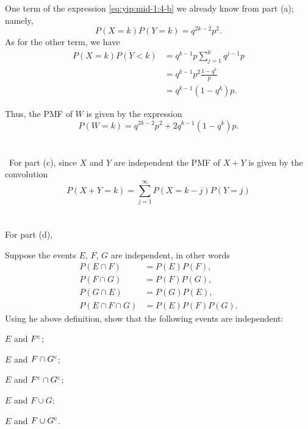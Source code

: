 \begin{solution*}
  One term of the expression \eqref{eq:yip:mid-1:4-b} we already know from
  part (a); namely,
  \[
    P(X=k)P(Y=k)=q^{2k-2}p^2.
  \]
  As for the other term, we have
  \begin{align*}
    P(X=k)P(Y<k)
    &=q^{k-1}p\sum_{j=1}^k q^{j-1}p\\
    &=q^{k-1}p^2\frac{1-q^k}{p}\\
    &=q^{k-1}(1-q^k)p.
  \end{align*}

  Thus, the PMF of \(W\) is given by the expression
  \[
    P(W=k)=q^{2k-2}p^2+2q^{k-1}(1-q^k)p.
  \]
  \\\\\
  For part (c), since \(X\) and \(Y\) are independent the PMF of \(X+Y\) is
  given by the convolution
  \[
    P(X+Y=k)=\sum_{j=1}^\infty P(X=k-j)P(Y=j)
  \]
  \\\\
  For part (d),
\end{solution*}

\begin{problem}
  Suppose the events \(E\), \(F\), \(G\) are independent, in other words
  \begin{align*}
    P(E\cap F)&=P(E)P(F),\\
    P(F\cap G)&=P(F)P(G),\\
    P(G\cap E)&=P(G)P(E),\\
    P(E\cap F\cap G)&=P(E)P(F)P(G).
  \end{align*}
  Using he above definition, show that the following events are
  independent:
  \begin{alphlist}
  \item \(E\) and \(F^{\mathrm{c}}\);
  \item \(E\) and \(F\cap G^{\mathrm{c}}\);
  \item \(E\) and \(F^{\mathrm{c}}\cap G^{\mathrm{c}}\);
  \item \(E\) and \(F\cup G\);
  \item \(E\) and \(F\cup G^{\mathrm{c}}\).
  \end{alphlist}
\end{problem}
\begin{solution*}
\end{solution*}

